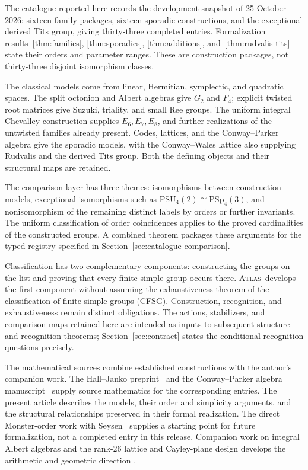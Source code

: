 \documentclass[11pt]{article}
\numberwithin{equation}{section}
\theoremstyle{definition}
\newcommand{\PSU}{\mathrm{PSU}}
\newcommand{\PSp}{\mathrm{PSp}}
\newcommand{\atlas}{\textsc{Atlas}}
\begin{document}
The catalogue reported here records the development snapshot of
25 October 2026: sixteen family packages, sixteen sporadic constructions,
and the exceptional derived Tits group, giving thirty-three completed
entries. Formalization results~\ref{thm:families}, \ref{thm:sporadics},
\ref{thm:additions}, and~\ref{thm:rudvalis-tits} state their orders and
parameter ranges. These are construction packages, not thirty-three
disjoint isomorphism classes.

The classical models come from linear, Hermitian, symplectic, and
quadratic spaces. The split octonion and Albert algebras give $G_2$ and
$F_4$; explicit twisted root matrices give Suzuki, triality, and small
Ree groups. The uniform integral Chevalley construction supplies
$E_6,E_7,E_8$, and further realizations of the untwisted families already
present. Codes, lattices, and the Conway--Parker algebra give the sporadic
models, with the Conway--Wales lattice also supplying Rudvalis and the
derived Tits group. Both the defining objects and their structural maps
are retained.

The comparison layer has three themes: isomorphisms between construction
models, exceptional isomorphisms such as $\PSU_4(2)\cong\PSp_4(3)$,
and nonisomorphism of the remaining distinct labels by orders or further
invariants. The uniform classification of order coincidences applies to
the proved cardinalities of the constructed groups. A combined theorem
packages these arguments for the typed registry specified in
Section~\ref{sec:catalogue-comparison}.


Classification has two complementary components: constructing the
groups on the list and proving that every finite simple group occurs
there. \atlas\ develops the first component without assuming the
exhaustiveness theorem of the classification of finite simple groups
(CFSG). Construction, recognition, and exhaustiveness remain distinct
obligations. The actions, stabilizers, and comparison maps retained
here are intended as inputs to subsequent structure and recognition
theorems; Section~\ref{sec:contract} states the conditional recognition
questions precisely.

The mathematical sources combine established constructions with the
author's companion work. The Hall--Janko preprint~\cite{HallJankoNote}
and the Conway--Parker algebra manuscript~\cite{FischerAlgebra}
supply source mathematics for the corresponding entries. The present
article describes the models, their order and simplicity arguments,
and the structural relationships preserved in their formal
realization. The direct Monster-order work with
Seysen~\cite{MonsterOrder} supplies a starting point for future
formalization, not a completed entry in this release. Companion work
on integral Albert algebras and the rank-26 lattice and Cayley-plane
design develops the arithmetic and geometric direction
\cite{AlbertMassNote,CayleyPlaneNote}.
\end{document}
